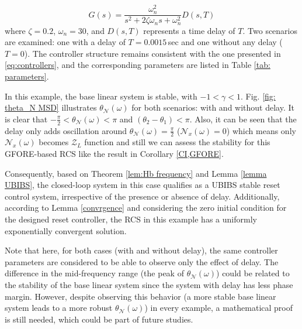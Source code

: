 \begin{equation}
\label{eq: M_S_D}
G(s) = \frac{\omega_n^2}{s^2 + 2\zeta\omega_n s + \omega_n^2} D(s, T)
\end{equation}
where $\zeta = 0.2$, $\omega_n = 30$, and $D(s, T)$ represents a time delay of $T$. Two scenarios are examined: one with a delay of $T = 0.0015\,$sec and one without any delay ($T = 0$). The controller structure remains consistent with the one presented in \eqref{eq:controllers}, and the corresponding parameters are listed in Table \ref{tab: parameters}.

In this example, the base linear system is stable, with $-1 < \gamma < 1$. Fig. \ref{fig: theta_N MSD} illustrates $\theta_{\mathcal{N}}(\omega)$ for both scenarios: with and without delay. It is clear that $-\frac{\pi}{2} < \theta_{\mathcal{N}}(\omega) < \pi$ and $(\theta_2 - \theta_1) < \pi$. Also, it can be seen that the delay only adds oscillation around $\theta_{\mathcal{N}}(\omega)=\frac{\pi}{2}$ ($\mathcal{N}_x (\omega)=0$) which means only $\mathcal{N}_x (\omega)$ becomes $\mathcal{Z}_L$ function and still we can assess the stability for this GFORE-based RCS like the result in Corollary \ref{CI,GFORE}. 

Consequently, based on Theorem \ref{lem:Hb frequency} and Lemma \ref{lemma UBIBS}, the closed-loop system in this case qualifies as a UBIBS stable reset control system, irrespective of the presence or absence of delay. Additionally, according to Lemma \ref{convrgence} and considering the zero initial condition for the designed reset controller, the RCS in this example has a uniformly exponentially convergent solution.

Note that here, for both cases (with and without delay), the same controller parameters are considered to be able to observe only the effect of delay. The difference in the mid-frequency range (the peak of $\theta_{\mathcal{N}}(\omega)$) could be related to the stability of the base linear system since the system with delay has less phase margin. However, despite observing this behavior (a more stable base linear system leads to a more robust $\theta_{\mathcal{N}}(\omega)$) in every example, a mathematical proof is still needed, which could be part of future studies.


